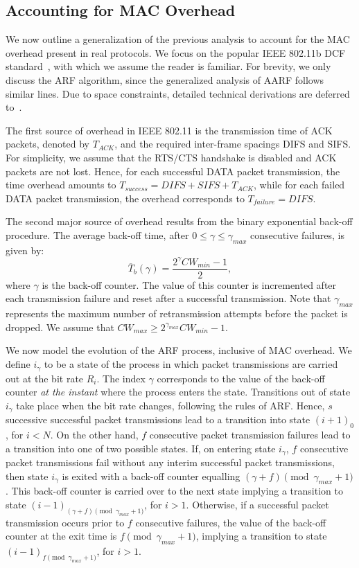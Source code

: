 \documentclass[11pt, journal, letterpaper, oneside, onecolumn]{IEEEtran}
\begin{document}
\subsection{Accounting for MAC Overhead}
\label{sec:ARF_IEEE}
We now outline a generalization of the previous analysis to account for the MAC overhead present in real protocols. We focus on the popular IEEE 802.11b DCF standard~\cite{ieee:80211}, with which we assume the reader is familiar.
For brevity, we only discuss the ARF algorithm, since the generalized analysis of AARF follows similar lines. Due to space constraints, detailed technical derivations are deferred to~\cite{angad-thesis}.

The first source of overhead in IEEE 802.11 is the transmission time of ACK packets, denoted by $T_{ACK}$, and the required  inter-frame spacings DIFS and SIFS. For simplicity, we assume that the RTS/CTS handshake is disabled and ACK packets are not lost. Hence, for each successful DATA packet transmission, the time overhead amounts to $T_{success}= DIFS + SIFS +T_{ACK}$, while for each failed DATA packet transmission, the overhead corresponds to $T_{failure}=DIFS$.


The second major source of overhead results from the binary exponential back-off procedure. The average back-off time, after $0 \leq \gamma \leq \gamma_{max}$ consecutive failures, is given by:
\begin{equation}\label{eq:T(n)}
\overline{T}_{b}(\gamma)=\frac{2^{\gamma}CW_{min}-1}{2},
\end{equation}
where $\gamma$ is the back-off counter. The value of this counter is incremented after each transmission failure and reset after a successful transmission.
Note that  $\gamma_{max}$ represents the maximum number of retransmission attempts before the packet is dropped. We assume that $CW_{max} \geq 2^{\gamma_{max}}CW_{min}-1$.

We now model the evolution of the ARF process, inclusive of MAC overhead. We define $i_{\gamma}$ to be a state of the process in which packet transmissions are carried out at the
bit rate $R_i$. The index $\gamma$ corresponds to the value of the back-off counter \emph{at the instant} where the process enters the state. Transitions out of state $i_{\gamma}$ take place when the bit rate changes, following the rules of ARF. Hence, $s$ successive successful packet transmissions
lead to a transition into state ${(i+1)}_0$, for $i < N$. On the other hand, $f$ consecutive packet transmission failures lead to a transition into one of two possible states. If, on entering state $i_{\gamma}$, $f$ consecutive packet transmissions fail without any interim successful packet transmissions, then state $i_{\gamma}$ is exited with
a back-off counter equalling $(\gamma+f) \pmod {\gamma_{max}+1}$. This back-off
counter is carried over to the next state implying a transition to state ${(i-1)}_{(\gamma+f)\pmod {\gamma_{max}+1}}$, for $i > 1$. Otherwise,
if a successful packet transmission occurs prior to $f$ consecutive failures, the value of the back-off counter at the exit time is ${f\pmod{ \gamma_{max}+1}}$, implying a transition to state ${(i-1)}_{f\pmod {\gamma_{max}+1}}$, for $i > 1$.
\end{document}
